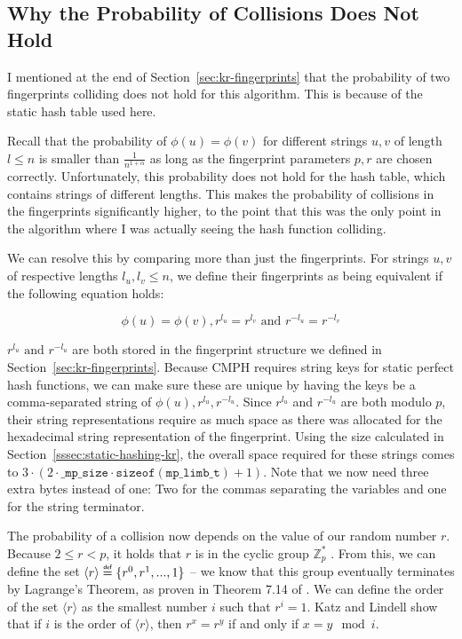 \documentclass[ %
                    author={Dominic Joseph Moylett},
                    degree={MEng},
                     title={Dictionary Matching with Fingerprints},
                  subtitle={An Empirical Analysis},
                      type={research},
                      year={2015} ]{dissertation}
\begin{document}
\subsection{Why the Probability of Collisions Does Not Hold}
\label{ssec:short-collisions}

I mentioned at the end of Section~\ref{sec:kr-fingerprints} that the probability of two fingerprints colliding does not hold for this algorithm. This is because of the static hash table used here.

Recall that the probability of $\phi(u) = \phi(v)$ for different strings $u, v$ of length $l \leq n$ is smaller than $\frac{1}{n^{1 + \alpha}}$ as long as the fingerprint parameters $p, r$ are chosen correctly. Unfortunately, this probability does not hold for the hash table, which contains strings of different lengths. This makes the probability of collisions in the fingerprints significantly higher, to the point that this was the only point in the algorithm where I was actually seeing the hash function colliding.

We can resolve this by comparing more than just the fingerprints. For strings $u, v$ of respective lengths $l_u, l_v \leq n$, we define their fingerprints as being equivalent if the following equation holds:

$$\phi(u) = \phi(v), r^{l_u} = r^{l_v} \text{ and } r^{-l_u} = r^{-l_v}$$

$r^{l_u} \text{ and } r^{-l_u}$ are both stored in the fingerprint structure we defined in Section~\ref{sec:kr-fingerprints}. Because CMPH requires string keys for static perfect hash functions, we can make sure these are unique by having the keys be a comma-separated string of $\phi(u),r^{l_u},r^{-l_u}$. Since $r^{l_u}$ and $r^{-l_u}$ are both modulo $p$, their string representations require as much space as there was allocated for the hexadecimal string representation of the fingerprint. Using the size calculated in Section~\ref{sssec:static-hashing-kr}, the overall space required for these strings comes to $3 \cdot (2 \cdot \texttt{\_mp\_size} \cdot \texttt{sizeof}(\texttt{mp\_limb\_t}) + 1)$. Note that we now need three extra bytes instead of one: Two for the commas separating the variables and one for the string terminator.

The probability of a collision now depends on the value of our random number $r$. Because $2 \leq r < p$, it holds that $r$ is in the cyclic group $\mathbb{Z}^*_p$ \cite[pp 254-256]{katz}. From this, we can define the set $\langle r \rangle \defeq \{r^0, r^1,...,1\}$ -- we know that this group eventually terminates by Lagrange's Theorem, as proven in Theorem 7.14 of \cite[p 253]{katz}. We can define the order of the set $\langle r \rangle$ as the smallest number $i$ such that $r^i = 1$. Katz and Lindell \cite[pp 274-277]{katz} show that if $i$ is the order of $\langle r \rangle$, then $r^x = r^y$ if and only if $x = y \mod i$.
\end{document}
